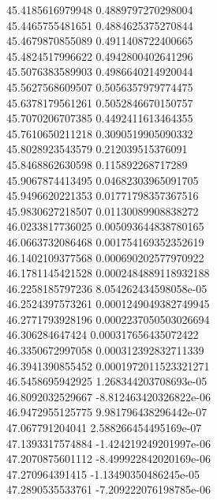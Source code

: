 {45.4185616979948 0.4889797270298004
 \\
45.4465755481651 0.4884625375270844
 \\
45.4679870855089 0.4911408722400665
 \\
45.4824517996622 0.4942800402641296
 \\
45.5076383589903 0.4986640214920044
 \\
45.5627568609507 0.5056357979774475
 \\
45.6378179561261 0.5052846670150757
 \\
45.7070206707385 0.4492411613464355
 \\
45.7610650211218 0.3090519905090332
 \\
45.8028923543579 0.212039515376091
 \\
45.8468862630598 0.115892268717289
 \\
45.9067874413495 0.04682303965091705
 \\
45.9496620221353 0.01771798357367516
 \\
45.9830627218507 0.01130089908838272
 \\
46.0233817736025 0.005093644838780165
 \\
46.0663732086468 0.001754169352352619
 \\
46.1402109377568 0.000690202577970922
 \\
46.1781145421528 0.0002484889118932188
 \\
46.2258185797236 8.054262434598058e-05
 \\
46.2524397573261 0.0001249049382749945
 \\
46.2771793928196 0.0002237050503026694
 \\
46.306284647424 0.000317656435072422
 \\
46.3350672997058 0.000312392832711339
 \\
46.3941390855452 0.0001972011523321271
 \\
46.5458695942925 1.268344203708693e-05
 \\
46.8092032529667 -8.812463420326822e-06
 \\
46.9472955125775 9.981796438296442e-07
 \\
47.067791204041 2.588266454495169e-07
 \\
47.1393317574884 -1.424219249201997e-06
 \\
47.2070875601112 -8.499922842020169e-06
 \\
47.270964391415 -1.13490350486245e-05
 \\
47.2890535533761 -7.209222076198785e-06
 \\
}
